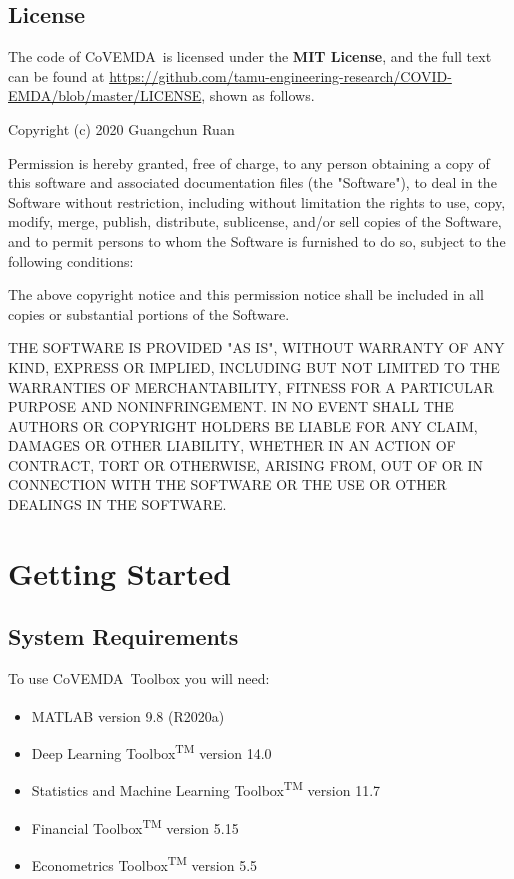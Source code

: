 \documentclass[10pt]{article}
\newcommand{\covemda}{CoVEMDA}
\numberwithin{equation}{section}
\numberwithin{table}{section}
\numberwithin{figure}{section}
\begin{document}
\subsection{License}
The code of \covemda~is licensed under the \textbf{MIT License}, and the full text can be found at  \url{https://github.com/tamu-engineering-research/COVID-EMDA/blob/master/LICENSE}, shown as follows.
\begin{Notice}
Copyright (c) 2020 Guangchun Ruan

Permission is hereby granted, free of charge, to any person obtaining a copy
of this software and associated documentation files (the "Software"), to deal
in the Software without restriction, including without limitation the rights
to use, copy, modify, merge, publish, distribute, sublicense, and/or sell
copies of the Software, and to permit persons to whom the Software is
furnished to do so, subject to the following conditions:

The above copyright notice and this permission notice shall be included in all
copies or substantial portions of the Software.

THE SOFTWARE IS PROVIDED "AS IS", WITHOUT WARRANTY OF ANY KIND, EXPRESS OR
IMPLIED, INCLUDING BUT NOT LIMITED TO THE WARRANTIES OF MERCHANTABILITY,
FITNESS FOR A PARTICULAR PURPOSE AND NONINFRINGEMENT. IN NO EVENT SHALL THE
AUTHORS OR COPYRIGHT HOLDERS BE LIABLE FOR ANY CLAIM, DAMAGES OR OTHER
LIABILITY, WHETHER IN AN ACTION OF CONTRACT, TORT OR OTHERWISE, ARISING FROM,
OUT OF OR IN CONNECTION WITH THE SOFTWARE OR THE USE OR OTHER DEALINGS IN THE
SOFTWARE.
\end{Notice}






\newpage
\section{Getting Started} \label{sec:start}

\subsection{System Requirements}
To use \covemda~Toolbox you will need:
\begin{itemize}
    \item MATLAB\textsuperscript{\tiny \textregistered} version 9.8 (R2020a)
    \item Deep Learning Toolbox\textsuperscript{\tiny TM} version 14.0
    \item Statistics and Machine Learning Toolbox\textsuperscript{\tiny TM} version 11.7
    \item Financial Toolbox\textsuperscript{\tiny TM} version 5.15
    \item Econometrics Toolbox\textsuperscript{\tiny TM} version 5.5
\end{itemize}
\end{document}
